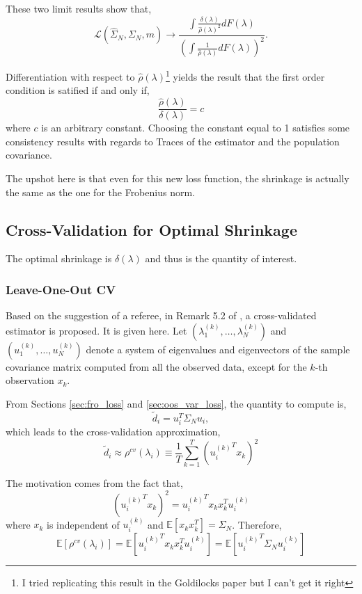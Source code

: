 \documentclass{article}
\begin{document}
These two limit results show that,
$$
	\mathcal{L}(\hat{\Sigma}_N, \Sigma_N, m)
		 \rightarrow \frac
		 		{\int \frac{\delta(\lambda)}{\hat{\rho}(\lambda)^2}dF(\lambda)}
		 		{\left( \int \frac{1}{\hat{\rho}(\lambda)}dF(\lambda) \right)^2}.
$$

Differentiation with respect to $\hat{\rho}(\lambda)$\footnote{I tried replicating this
result in the Goldilocks paper but I can't get it right} yields the result that
the first order condition is satified if and only if,
$$
	\frac{\hat{\rho}(\lambda)}{\delta(\lambda)} = c
$$
where $c$ is an arbitrary constant.  Choosing the constant equal to 1 satisfies
some consistency results with regards to Traces of the estimator and the
population covariance.

The upshot here is that even for this new loss function, the shrinkage is
actually the same as the one for the Frobenius norm.

\subsection{Cross-Validation for Optimal Shrinkage}

The optimal shrinkage is $\delta(\lambda)$ and thus is the quantity of interest.

\subsubsection{Leave-One-Out CV}\label{sec:loo}

Based on the suggestion of a referee, in Remark 5.2 of
\cite{Ledoit2012Nonlinear}, a cross-validated estimator is proposed.  It is
given here. Let $\left(\lambda_1^{(k)}, \ldots, \lambda_N^{(k)}\right)$ and
$\left(u_1^{(k)}, \ldots, u_N^{(k)}\right)$ denote a system of eigenvalues and
eigenvectors of the sample covariance matrix computed from all the observed
data, except for the $k$-th observation $x_k$.

From Sections \ref{sec:fro_loss} and \ref{sec:oos_var_loss}, the quantity to
compute is,
$$
	\tilde{d}_i= u_i^T \Sigma_N u_i,
$$
which leads to the cross-validation approximation,
$$
	\tilde{d}_i \approx \rho^{cv}(\lambda_i) 
		\equiv \frac1T \sum_{k=1}^T ({u_i^{(k)}}^T x_k)^2
$$

The motivation comes from the fact that,
$$
	({u_i^{(k)}}^T x_k)^2 = {u_i^{(k)}}^T x_k x_k^T u_i^{(k)} 
$$
where $x_k$ is independent of $u_i^{(k)}$ and $\mathbb{E}\left[x_k x_k^T\right]
= \Sigma_N$. Therefore,
$$
	\mathbb{E}\left[\rho^{cv}(\lambda_i)\right]
		 = \mathbb{E}\left[{u_i^{(k)}}^T x_k x_k^T u_i^{(k)}\right]
		 = \mathbb{E}\left[{u_i^{(k)}}^T \Sigma_N u_i^{(k)}\right]
$$
\end{document}
